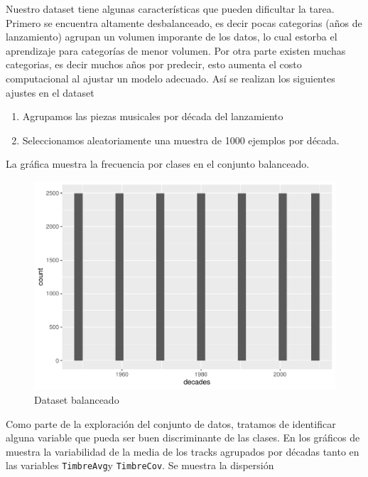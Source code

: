 \documentclass[conference,final,]{IEEEtran}
\providecommand{\tightlist}{%
  \setlength{\itemsep}{0pt}\setlength{\parskip}{0pt}}
\begin{document}
Nuestro dataset tiene algunas características que pueden dificultar la
tarea. Primero se encuentra altamente desbalanceado, es decir pocas
categorias (años de lanzamiento) agrupan un volumen imporante de los
datos, lo cual estorba el aprendizaje para categorías de menor volumen.
Por otra parte existen muchas categorias, es decir muchos años por
predecir, esto aumenta el costo computacional al ajustar un modelo
adecuado. Así se realizan los siguientes ajustes en el dataset

\begin{enumerate}
\def\labelenumi{\arabic{enumi}.}
\tightlist
\item
  Agrupamos las piezas musicales por década del lanzamiento
\item
  Seleccionamos aleatoriamente una muestra de 1000 ejemplos por década.
\end{enumerate}

La gráfica muestra la frecuencia por clases en el conjunto balanceado.

\begin{figure}[H]

{\centering \includegraphics[width=0.6\linewidth]{YearPrediction_Reporte_files/figure-latex/unnamed-chunk-11-1} 

}

\caption{Dataset balanceado}\label{fig:unnamed-chunk-11}
\end{figure}

Como parte de la exploración del conjunto de datos, tratamos de
identificar alguna variable que pueda ser buen discriminante de las
clases. En los gráficos de muestra la variabilidad de la media de los
tracks agrupados por décadas tanto en las variables \texttt{TimbreAvg}y
\texttt{TimbreCov}. Se muestra la dispersión
\end{document}
